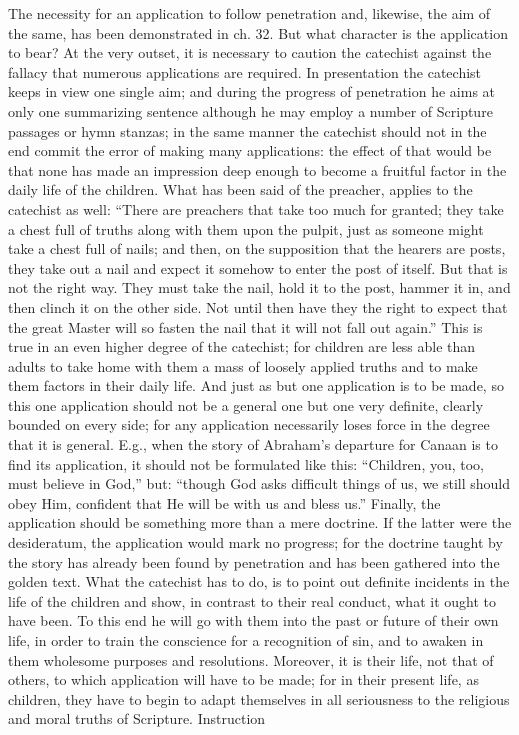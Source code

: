 The necessity for an application to follow penetration and, likewise, the aim of the same, has been demonstrated in ch. 32. But what character is the application to bear? At the very outset, it is necessary to caution the catechist against the fallacy that numerous applications are required. In presentation the catechist keeps in view one single aim; and during the progress of penetration he aims at only one summarizing sentence although he may employ a number of Scripture passages or hymn stanzas; in the same manner the catechist should not in the end commit the error of making many applications: the effect of that would be that none has made an impression deep enough to become a fruitful factor in the daily life of the children. What has been said of the preacher, applies to the catechist as well: “There are preachers that take too much for granted; they take a chest full of truths along with them upon the
pulpit, just as someone might take a chest full of nails; and then, on the supposition that the hearers are posts, they take out a nail and expect it somehow to enter the post of itself. But that is not the right way. They must take the nail, hold it to the post, hammer it in, and then clinch it on the other side. Not until then have they the right to expect that the great Master will so fasten the nail that it will not fall out again.” This is true in an even higher degree of the catechist; for children are less able than adults to take home with them a mass of loosely applied truths and to make them factors in their daily life. And just as but one application is to be made, so this one application should not be a general one but one very definite, clearly bounded on every side; for any application necessarily loses force in the degree that it is general. E.g., when the story of Abraham’s departure for Canaan is to find its application, it should not be formulated like this: “Children, you, too, must believe in God,” but: “though God asks difficult things of us, we still should obey Him, confident that He will be with us and bless us.” Finally, the application should be something more than a mere doctrine. If the latter were the desideratum, the application would mark no progress; for the doctrine taught by the story has already been found by penetration and has been gathered into the golden text. What the catechist has to do, is to point out definite incidents in the life of the children and show, in contrast to their real conduct, what it ought to have been. To this end he will go with them into the past or future of their own life, in order to train the conscience for a recognition of sin, and to awaken in them wholesome purposes and resolutions. Moreover, it is their life, not that of others, to which application will have to be made; for in their present life, as children, they have to begin to adapt themselves in all seriousness to the religious and moral truths of Scripture. Instruction
